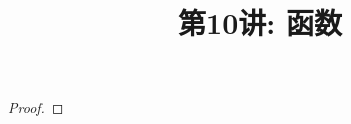 \documentclass[a4paper, justified]{tufte-handout}
\title{第10讲: 函数}
\date{\zhtoday} %
\begin{document}
\maketitle
\noplagiarism %
\begin{abstract}
  \begin{center}{}
  \end{center}
\end{abstract}
\beginrequired

\begin{problem}[UD Problem 14.3 (b, d, g)]
\end{problem}

\begin{solution}
\end{solution}

\begin{problem}[UD Problem 14.5]
\end{problem}

\begin{proof}
\end{proof}

\begin{problem}[UD Problem 14.23]
\end{problem}

\begin{solution}
\end{solution}

\begin{problem}[UD Problem 15.10 (f, g, h)]
\end{problem}

\begin{solution}
\end{solution}

\begin{problem}[UD Problem 15.14]
\end{problem}

\begin{solution}
\end{solution}
\end{document}
